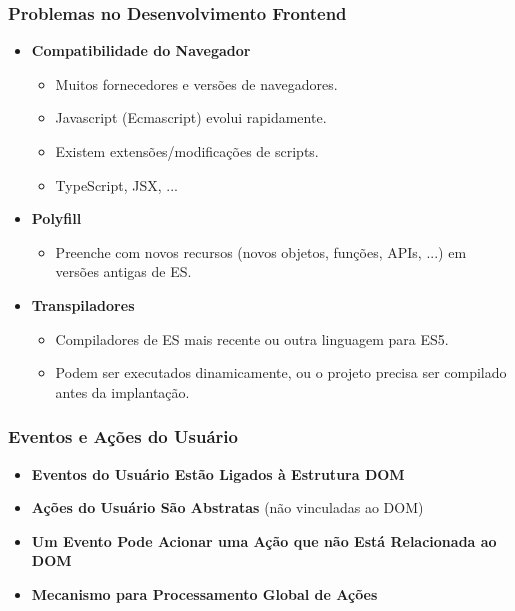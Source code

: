\documentclass{beamer}
\begin{document}
\begin{frame}
      \frametitle{Problemas no Desenvolvimento Frontend}

      \begin{itemize}
            \item \textbf{Compatibilidade do Navegador}
                  \begin{itemize}
                        \item Muitos fornecedores e versões de navegadores.
                        \item Javascript (Ecmascript) evolui rapidamente.
                        \item Existem extensões/modificações de scripts.
                        \item TypeScript, JSX, ...
                  \end{itemize}

            \item \textbf{Polyfill}
                  \begin{itemize}
                        \item Preenche com novos recursos (novos objetos, funções, APIs, ...) em versões antigas de ES.
                  \end{itemize}

            \item \textbf{Transpiladores}
                  \begin{itemize}
                        \item Compiladores de ES mais recente ou outra linguagem para ES5.
                        \item Podem ser executados dinamicamente, ou o projeto precisa ser compilado antes da implantação.
                  \end{itemize}
      \end{itemize}

\end{frame}

\begin{frame}
      \frametitle{Eventos e Ações do Usuário}

      \begin{itemize}
            \item \textbf{Eventos do Usuário Estão Ligados à Estrutura DOM}

            \item \textbf{Ações do Usuário São Abstratas} (não vinculadas ao DOM)

            \item \textbf{Um Evento Pode Acionar uma Ação que não Está Relacionada ao DOM}

            \item \textbf{Mecanismo para Processamento Global de Ações}
      \end{itemize}

\end{frame}
\end{document}
